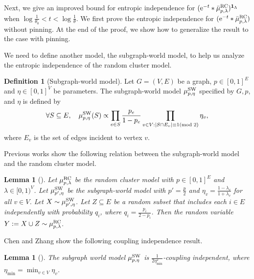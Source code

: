 \documentclass[11pt,a4paper]{article}
\newcommand{\e}{\mathrm{e}}
\newtheorem{lemma}[theorem]{Lemma}
\theoremstyle{definition}
\newtheorem{definition}[theorem]{Definition}
\newcommand{\abs}[1]{\left\vert#1\right\vert}
\def\*#1{\mathbf{#1}} %
\begin{document}
Next, we give an improved bound for entropic independence for $(\e^{-t}*\bar{\mu}_{p,\lambda}^{\textnormal{RC}})^{\*1_\Lambda}$ when $\log\frac{1}{\theta_0} < t < \log \frac{1}{\theta}$. 
We first prove the entropic independence for $(\e^{-t}*\bar{\mu}_{p,\lambda}^{\textnormal{RC}})$ without pinning. At the end of the proof, we show how to generalize the result to the case with pinning.


We need to define another model, the subgraph-world model, to help us analyze the entropic independence of the random cluster model.



\begin{definition}[Subgraph-world model]
Let $G=(V,E)$ be a graph,  $p\in [0,1]^E$ and $\eta \in [0,1]^V$ be parameters. The subgraph-world model $\mu_{p,\eta}^{\textnormal{SW}}$ specified by $G,p$, and $\eta$ is defined by 
\begin{align*}
    \forall S\subseteq E,\quad \mu_{p,\eta}^{\textnormal{SW}}(S)\propto \prod_{e\in S} \frac{p_e}{1-p_e} \prod_{v\in V:\abs{S\cap E_v}\equiv 1 (\textnormal{mod }2)}\eta_v,
\end{align*}
where $E_v$ is the set of edges incident to vertex $v$.
\end{definition}

Previous works \cite{GJ18,feng2023swendsen} show the following relation between the subgraph-world model and the random cluster model.

\begin{lemma}[]\label{lem:random-var-rc-sw}
Let $\mu_{p,\lambda}^{\textnormal{RC}}$ be the random cluster model with $p\in [0,1]^E$ and $\lambda\in [0,1)^V$. Let $\mu_{p',\eta}^{\textnormal{SW}}$ be the subgraph-world model with $p'=\frac{p}{2}$ and $\eta_v =\frac{1-\lambda_v}{1+\lambda_v}$ for all $v \in V$.
Let $X\sim \mu_{p',\eta}^{\textnormal{SW}}$. 
Let $Z \subseteq E$ be a random subset that includes each $i \in E$ independently with probability $q_i$, where $q_i = \frac{p_i}{2-p_i}$.
Then the random variable $Y:=X\cup Z \sim \mu_{p,\lambda}^{\textnormal{RC}}$.
\end{lemma} %



Chen and Zhang \cite{CZ23} show the following coupling independence result.
\begin{lemma}[]\label{lem:sw-CI}
The subgraph world model $\mu_{p,\eta}^{\textnormal{SW}}$ is $\frac{1}{2\eta_{\min}^2}$-coupling independent, where $\eta_{\min} = \min_{v\in V}\eta_v$.
\end{lemma}
\end{document}
